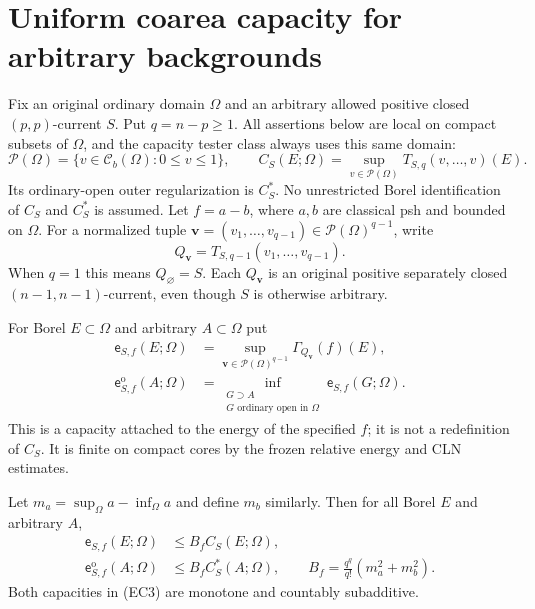 \section{Uniform coarea capacity for arbitrary backgrounds}
\label{sec:r11-uniform-coarea-capacity}

Fix an original ordinary domain $\Omega$ and an arbitrary
allowed positive closed $(p,p)$-current $S$.  Put $q=n-p\ge1$.
All assertions below are local on compact subsets of $\Omega$,
and the capacity tester class always uses this same domain:
\[
 \mathcal P(\Omega)
  =\{v\in\mathcal C_b(\Omega):0\le v\le1\},
 \qquad
 C_S(E;\Omega)
  =\sup_{v\in\mathcal P(\Omega)}T_{S,q}(v,\ldots,v)(E).
 \tag{EC1}
\]
Its ordinary-open outer regularization is $C_S^*$.
No unrestricted Borel identification of $C_S$ and $C_S^*$
is assumed.  Let $f=a-b$, where $a,b$ are classical psh and
bounded on $\Omega$.  For a normalized tuple
$\mathbf v=(v_1,\ldots,v_{q-1})\in\mathcal P(\Omega)^{q-1}$,
write
\[
 Q_{\mathbf v}=T_{S,q-1}(v_1,\ldots,v_{q-1}).
 \tag{EC2}
\]
When $q=1$ this means $Q_{\varnothing}=S$.
Each $Q_{\mathbf v}$ is an original positive separately closed
$(n-1,n-1)$-current, even though $S$ is otherwise arbitrary.

\begin{definition}
\label{def:r11-energy-layer-capacity}
For Borel $E\subset\Omega$ and arbitrary $A\subset\Omega$ put
\[
 \begin{split}
 \mathsf e_{S,f}(E;\Omega)
    &=\sup_{\mathbf v\in\mathcal P(\Omega)^{q-1}}
                          \Gamma_{Q_{\mathbf v}}(f)(E),\\
 \mathsf e_{S,f}^{\mathrm o}(A;\Omega)
    &=\inf_{\substack{G\supset A\\G\text{ ordinary open in }\Omega}}
                                      \mathsf e_{S,f}(G;\Omega).
 \end{split}
 \tag{EC3}
\]
This is a capacity attached to the energy of the specified $f$;
it is not a redefinition of $C_S$.  It is finite on compact
cores by the frozen relative energy and CLN estimates.
\end{definition}

\begin{lemma}
\label{lem:r11-energy-layer-BT-bound}
Let $m_a=\sup_\Omega a-\inf_\Omega a$ and define $m_b$
similarly.  Then for all Borel $E$ and arbitrary $A$,
\[
 \begin{split}
 \mathsf e_{S,f}(E;\Omega)&\le B_f C_S(E;\Omega),\\
 \mathsf e_{S,f}^{\mathrm o}(A;\Omega)&\le B_f C_S^*(A;\Omega),
 \qquad
 B_f=\frac{q^q}{q!}(m_a^2+m_b^2).
 \end{split}
 \tag{EC4}
\]
Both capacities in (EC3) are monotone and countably subadditive.
\end{lemma}

